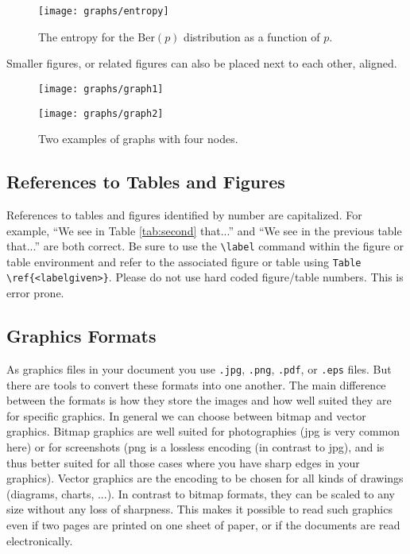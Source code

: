 \documentclass[a4paper,11pt]{article}
\theoremstyle{plain}
\theoremstyle{definition}
\begin{document}
\begin{figure}[H]
\centering
\texttt{[image: graphs/entropy]}
\caption{The entropy for the {\sf Ber}$(p )$ distribution as a function of $p$.}
\label{fig:entropy}
\end{figure}

\noindent
Smaller figures, or related figures can also be placed next to each other, aligned.

\begin{figure}[H]
\centering
\begin{boxedminipage}{0.4\textwidth}
\texttt{[image: graphs/graph1]}
\end{boxedminipage}
\hspace{0.1\textwidth}
\begin{boxedminipage}{0.4\textwidth}
\texttt{[image: graphs/graph2]}
\end{boxedminipage}
\caption{Two examples of graphs with four nodes.}
\label{fig:graphs}
\end{figure}


\subsection{References to Tables and Figures}
References to tables and figures identified by number are capitalized.
For example, ``We see in Table \ref{tab:second} that...'' and
``We see in the previous table that...'' are both correct.
Be sure to use the \verb+\label+
command within the figure or table environment and refer to the
associated figure or table using \verb+Table \ref{<labelgiven>}+.
Please do not use hard coded figure/table numbers.
This is error prone.

\subsection{Graphics Formats}
As graphics files in your document you use \texttt{.jpg}, \texttt{.png}, 
\texttt{.pdf}, or \texttt{.eps} files.
But there are tools to convert these formats into one another.
The main difference between the formats is how they store the images and how
well suited they are for specific graphics. In general we can
choose between bitmap and vector graphics.
Bitmap graphics are well suited for photographies (jpg is very common here)
or for screenshots (png is a lossless encoding (in contrast to jpg),
and is thus better suited for all those cases where you have sharp edges in your graphics).
Vector graphics are the encoding to be chosen for all kinds of drawings
(diagrams, charts, ...). In contrast to bitmap formats, they can be scaled
to any size without any loss of sharpness. This makes it possible to
read such graphics even if two pages are printed on one sheet of paper,
or if the documents are read electronically.
\end{document}
